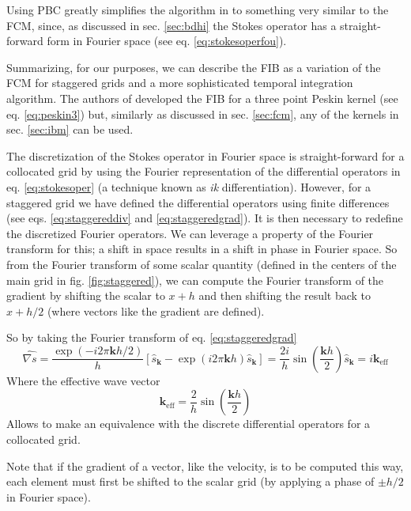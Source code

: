 \documentclass[ twoside,openright,titlepage,numbers=noenddot,%
headinclude,footinclude,cleardoublepage=empty,abstract=on,
BCOR=5mm,paper=a4,fontsize=11pt, dvipsnames
]{scrreprt}
\renewcommand{\vec}[1]{\bm{#1}}
\newcommand{\fou}[1]{\widehat{#1}}
\begin{document}
Using \gls{PBC} greatly simplifies the algorithm in \cite{Delong2014} to something very similar to the \gls{FCM}, since, as discussed in sec. \ref{sec:bdhi} the Stokes operator has a straight-forward form in Fourier space (see eq. \eqref{eq:stokesoperfou}).

Summarizing, for our purposes, we can describe the \gls{FIB} as a variation of the \gls{FCM} for staggered grids and a more sophisticated temporal integration algorithm. The authors of \cite{Delong2013} developed the \gls{FIB} for a three point Peskin kernel (see eq. \eqref{eq:peskin3}) but, similarly as discussed in sec. \ref{sec:fcm}, any of the kernels in sec. \ref{sec:ibm} can be used.

The discretization of the Stokes operator in Fourier space is straight-forward for a collocated grid by using the Fourier representation of the differential operators in eq. \eqref{eq:stokesoper} (a technique known as \emph{ik} differentiation). However, for a staggered grid we have defined the differential operators using finite differences (see eqs. \eqref{eq:staggereddiv} and \eqref{eq:staggeredgrad}). It is then necessary to redefine the discretized Fourier operators. We can leverage a property of the Fourier transform for this; a shift in space results in a shift in phase in Fourier space. So from the Fourier transform of some scalar quantity (defined in the centers of the main grid in fig. \ref{fig:staggered}), we can compute the Fourier transform of the gradient by shifting the scalar to $x+h$ and then shifting the result back to $x+h/2$ (where vectors like the gradient are defined).

So by taking the Fourier transform of eq. \eqref{eq:staggeredgrad}
\begin{equation}
  \label{eq:staggeredgradfou}
  \fou{\nabla s} = \frac{\exp(-i2\pi \vec{k} h/2)}{h}\left[\fou{s}_{\vec{k}} - \exp(i2\pi \vec{k} h)\fou{s}_{\vec{k}}\right] = \frac{2i}{h}\sin\left(\frac{\vec{k} h}{2}\right)\fou{s}_{\vec{k}} = i\vec{k}_{\text{eff}}
\end{equation}
Where the effective wave vector
\begin{equation}
  \vec{k}_{\text{eff}} = \frac{2}{h}\sin\left(\frac{\vec{k}h}{2}\right)
\end{equation}
Allows to make an equivalence with the discrete differential operators for a collocated grid.

Note that if the gradient of a vector, like the velocity, is to be computed this way, each element must first be shifted to the scalar grid (by applying a phase of $\pm h/2$ in Fourier space).
\end{document}
